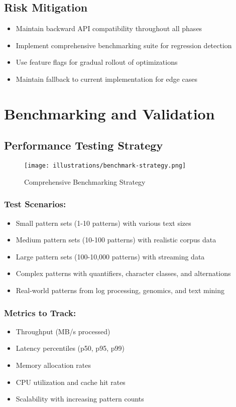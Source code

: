 \documentclass[11pt,a4paper]{article}
\begin{document}
\subsection{Risk Mitigation}

\begin{itemize}
\item Maintain backward API compatibility throughout all phases
\item Implement comprehensive benchmarking suite for regression detection
\item Use feature flags for gradual rollout of optimizations
\item Maintain fallback to current implementation for edge cases
\end{itemize}

\section{Benchmarking and Validation}

\subsection{Performance Testing Strategy}

\begin{figure}[htbp]
\centering
\texttt{[image: illustrations/benchmark-strategy.png]}
\caption{Comprehensive Benchmarking Strategy}
\label{fig:benchmark}
\end{figure}

\subsubsection{Test Scenarios:}
\begin{itemize}
\item Small pattern sets (1-10 patterns) with various text sizes
\item Medium pattern sets (10-100 patterns) with realistic corpus data  
\item Large pattern sets (100-10,000 patterns) with streaming data
\item Complex patterns with quantifiers, character classes, and alternations
\item Real-world patterns from log processing, genomics, and text mining
\end{itemize}

\subsubsection{Metrics to Track:}
\begin{itemize}
\item Throughput (MB/s processed)
\item Latency percentiles (p50, p95, p99)
\item Memory allocation rates
\item CPU utilization and cache hit rates
\item Scalability with increasing pattern counts
\end{itemize}
\end{document}

